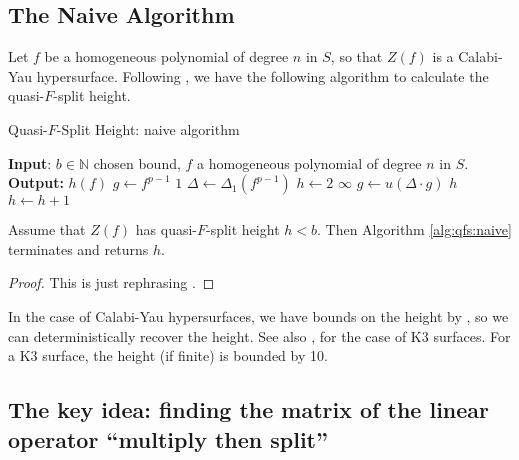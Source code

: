 \subsection{The Naive Algorithm}

Let \(f\) be a homogeneous polynomial of degree \(n\) 
in \(S\), 
so that \(Z(f)\) is a Calabi-Yau hypersurface.
Following \cite{kty-2022-fedder}, we have the following
algorithm to calculate the quasi-\(F\)-split height.

\begin{algorithm}[H]
\caption{Quasi-\(F\)-Split Height: naive algorithm}
\label{alg:qfs:naive}
\begin{algorithmic}[1]
\State \textbf{Input}: \(b \in \mathbb{N}\) chosen bound, \(f\) a homogeneous
	polynomial of degree \(n\) in \(S\).
\State \textbf{Output:} $h(f)$
\State \(g \gets f^{p-1}\) 
    \State \Return \(1\) 
\EndIf
\State \(\Delta \gets \Delta_{1}(f^{p-1})\) 
\State \(h \gets 2\) 
        \State \Return \(\infty\)
    \EndIf
    \State \(g \gets u(\Delta \cdot g)\) 
        \State \Return \(h\) 
    \EndIf
    \State \(h \gets h + 1\)
\EndWhile
\end{algorithmic}
\end{algorithm}

\begin{thm}
	Assume that
	\(Z(f)\) has quasi-\(F\)-split height \(h < b\).
	Then Algorithm \ref{alg:qfs:naive} terminates
	and returns \(h\).
\end{thm}

\begin{proof}
	This is just rephrasing \cite[Theorem~C]{kty-2022-fedder}.
\end{proof}

In the case of Calabi-Yau hypersurfaces, we have bounds on the height by
\cite{van-der-geer-katsura-2003-calabi-yau},
so we can deterministically recover the height.  
See also \cite[Theorem~0.1]{artin-1974-k3-surfaces},
for the case of K3 surfaces.
For a K3 surface, the height (if finite) is bounded by 10.

\subsection{The key idea: finding the matrix of the linear operator ``multiply then split''}

